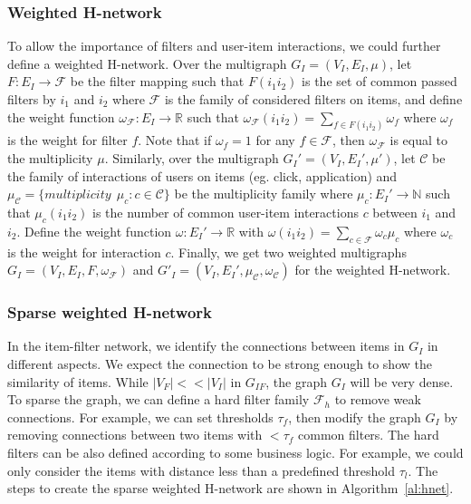 \documentclass[manuscript,screen,review]{acmart}
\newcommand\Fcal{\mathcal{F}}
\begin{document}
\subsubsection{Weighted H-network} To allow the importance of filters and user-item interactions, we could further define a weighted H-network.
Over the multigraph $G_I=(V_I,E_I,\mu)$, let $F:E_I\to \mathcal{F}$ be the filter mapping such that $F(i_1i_2)$ is the set of common passed filters by $i_1$ and $i_2$ where $\mathcal{F}$ is the family of considered filters on items,
and  define the weight function $\omega_\mathcal{F}: E_I\to\mathbb{R}$ such that $\omega_\mathcal{F}(i_1i_2)=\sum_{f\in F(i_1i_2)}\omega_f$ where $\omega_f$ is the weight for filter $f$. Note that if $\omega_f=1$ for any $f\in\mathcal{F}$, then $\omega_\mathcal{F}$ is equal to the multiplicity $\mu$. 
Similarly, over the multigraph $G_I'=(V_I,E_I',\mu')$, 
let $\mathcal{C}$ be the family of interactions of users on items (eg. click, application) and $\mu_{\mathcal{C}}=\{multiplicity\ \ \mu_c: c\in\mathcal{C}\}$ be the multiplicity family where $\mu_c: E_I'\to\mathbb{N}$ such that $\mu_c(i_1i_2)$ is the number of common user-item interactions $c$ between $i_1$ and $i_2$. Define the weight function $\omega: E_I'\to\mathbb{R}$ with $\omega(i_1i_2)=\sum_{c\in\mathcal{F}}\omega_c\mu_c$ where $\omega_c$ is the weight for interaction $c$. Finally, we get two weighted multigraphs $G_I=(V_I,E_I,F,\omega_{\mathcal{F}})$ and $G'_I=(V_I,E_I',\mu_{\mathcal{C}},\omega_{\mathcal{C}})$ for the weighted H-network.

\subsubsection{Sparse weighted H-network} In the item-filter network, we identify the connections between items in $G_I$ in different aspects. We expect the connection to be strong enough to show the similarity of items. While $|V_F|<<|V_I|$ in $G_{IF}$, the graph $G_{I}$ will be very dense. To sparse the graph, we can define a hard filter family $\Fcal_h$ to remove weak connections. For example, we can set thresholds $\tau_f$, then modify the graph $G_{I}$ by removing connections between two items with $<\tau_f$ common filters. The hard filters can be also defined according to some business logic. For example, we could only consider the items with distance less than a predefined threshold $\tau_l$. The steps to create the sparse weighted H-network are shown in Algorithm~\ref{al:hnet}. 
\end{document}
